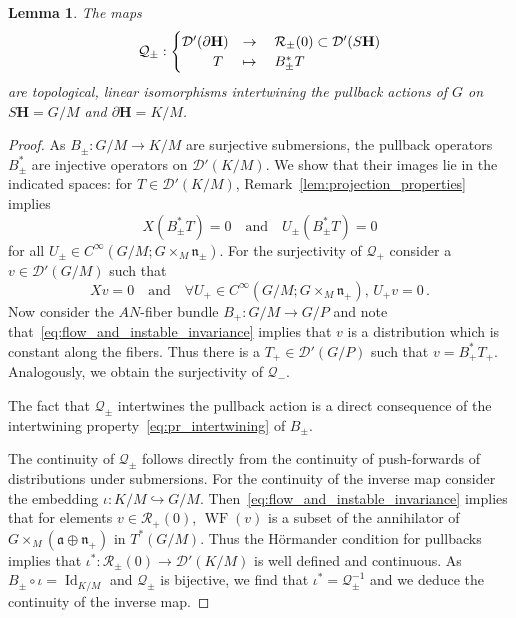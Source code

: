 \documentclass[10pt]{amsart}
\newtheorem{lemm}[cdrthm]{Lemma}
\theoremstyle{definition}
\DeclareMathOperator{\WF}{WF}
\DeclareMathOperator{\Id}{Id}
\newcommand{\mc}{\mathcal}
\newcommand{\bfh}{\mathbf{H}}
\newcommand{\pl}{\partial}
\newcommand{\x}{\times}
\newcommand{\n}{\mathfrak n}
\renewcommand{\a}{\mathfrak a}
\let\oldforall\forall
\renewcommand*{\forall}{\mathrel{\oldforall}}
\begin{document}
\begin{lemm}\label{lem:Q_pm}
The maps
\[
\mathcal Q_\pm: 
\begin{cases}
\mathcal D'(\pl{\bfh}) & \rightarrow\quad\mc{R}_\pm(0)\subset \mc{D}'(S{\bfh})\\
\mkern 40mu T &\mapsto\quad B_{\pm}^*T
\end{cases}
\]
are topological, linear isomorphisms intertwining the pullback actions of $G$ on\linebreak$S{\bfh}=G/M$ and $\pl{\bfh}=K/M$.
\end{lemm}



\begin{proof}
As $B_{\pm}:G/M\to K/M$ are surjective submersions, the pullback operators $B_{\pm}^*$ are injective operators on $\mathcal D'(K/M)$. We show that their images lie in the indicated spaces: for $T\in \mathcal D'(K/M)$, Remark~\ref{lem:projection_properties} implies
\[
X \left(B^*_{\pm}T\right)=0 \quad \text{and}\quad U_\pm \left(B^*_\pm T\right)=0
\]
for all $U_\pm\in C^\infty(G/M;G\times_M \n_\pm)$. For the surjectivity of $\mathcal Q_+$ consider a $v\in \mathcal D'(G/M)$ such that
\begin{equation}\label{eq:flow_and_instable_invariance}
X v= 0\quad\text{and}\quad\forall U_+ \in C^\infty(G/M; G\times_M \n_+),\,U_+ v= 0\,.
\end{equation}
Now consider the $AN$-fiber bundle $B_+: G/M \to G/P$ and note that~\eqref{eq:flow_and_instable_invariance} implies that $v$ is a distribution which is constant along the fibers. Thus there is a $T_+\in\mathcal D'(G/P)$ such that $v= B_+^*T_+ $. Analogously, we obtain the surjectivity of $\mathcal Q_-$.

The fact that $\mathcal Q_\pm$ intertwines the pullback action is a direct consequence of the intertwining property~\eqref{eq:pr_intertwining} of $B_\pm$.

The continuity of $\mathcal Q_\pm$ follows directly from the continuity of push-forwards of distributions under submersions. For the continuity of the inverse map consider the embedding $\iota: K/M \hookrightarrow G/M$. Then~\eqref{eq:flow_and_instable_invariance} implies that for elements $v\in \mc{R}_+(0)$, $\WF(v)$ is a subset of the annihilator of $G\x_M(\a \oplus\n_+)$ in $T^*(G/M)$. Thus the H\"ormander condition for pullbacks~\cite[Theorem~8.2.4]{HoeI} implies that $\iota^*:\mc{R}_\pm(0) \to \mathcal D'(K/M)$ is well defined and continuous. As $B_\pm\circ \iota = \Id_{K/M}$ and $\mathcal Q_\pm$ is bijective, we find that $\iota^*=\mathcal Q_\pm^{-1}$ and we deduce the continuity of the inverse map.
\end{proof}
\end{document}
